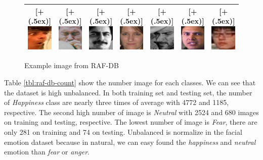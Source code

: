 \documentclass[12pt]{article}
\newcommand*{\addheight}[2][.5ex]{%
  \raisebox{0pt}[\dimexpr\height+(#1)\relax]{#2}%
}
\begin{document}
\begin{figure} [h!]
\begin{tabular}{|c|c|c|c|c|c|c|}
      \addheight{\includegraphics[width=18mm]{imgs/test_0043_aligned-1-2.jpg}} &
      \addheight{\includegraphics[width=18mm]{imgs/test_0274_aligned-2-2.jpg}} &
      \addheight{\includegraphics[width=18mm]{imgs/train_09745_aligned-3-2.jpg}} &
      \addheight{\includegraphics[width=18mm]{imgs/test_0055_aligned-4-2.jpg}} &
      \addheight{\includegraphics[width=18mm]{imgs/test_0049_aligned-5-2.jpg}} &
      \addheight{\includegraphics[width=18mm]{imgs/test_0057_aligned-6-2.jpg}} &
      \addheight{\includegraphics[width=18mm]{imgs/train_09759_aligned-7-2.jpg}} \\
      \hline
\end{tabular}
    \caption{Example image from RAF-DB}
    \label{fig:raf-db-example}
\end{figure}


Table \ref{tbl:raf-db-count} show the number image for each classes.
We can see that the dataset is high unbalanced.
In both training set and testing set, the number of \textit{Happiness} class are nearly three times of average with 4772 and 1185, respective.
The second high number of image is \textit{Neutral} with 2524 and 680 images on training and testing, respective.
The lowest number of image is \textit{Fear}, there are only 281 on training and 74 on testing.
Unbalanced is normalize in the facial emotion dataset because in natural, we can easy found the \textit{happiness} and \textit{neutral} emotion than \textit{fear} or \textit{anger}.
\end{document}
